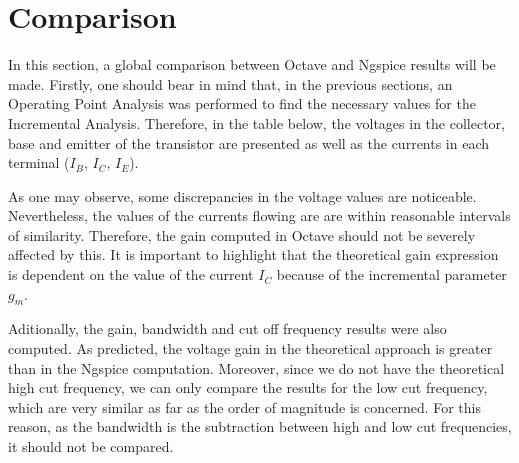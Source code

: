 \section{Comparison}
\label{section:comparison}

\par In this section, a global comparison between Octave and Ngspice results will be made. Firstly, one should bear in mind that, in the previous sections, an Operating Point Analysis was performed to find the necessary values for the Incremental Analysis. Therefore, in the table below, the voltages in the collector, base and emitter of the transistor are presented as well as the currents in each terminal ($I_{B}$, $I_{C}$, $I_{E}$).



\par As one may observe, some discrepancies in the voltage values are noticeable. Nevertheless, the values of the currents flowing are are within reasonable intervals of similarity. Therefore, the gain computed in Octave should not be severely affected by this. It is important to highlight that the theoretical gain expression is dependent on the value of the current $I_{C}$ because of the incremental parameter $g_{m}$. 
\newpage


\par Aditionally, the gain, bandwidth and cut off frequency results were also computed. As predicted, the voltage gain in the theoretical approach is greater than in the Ngspice computation. Moreover, since we do not have the theoretical high cut frequency, we can only compare the results for the low cut frequency, which are very similar as far as the order of magnitude is concerned. For this reason, as the bandwidth is the subtraction between high and low cut frequencies, it should not be compared.

\clearpage












